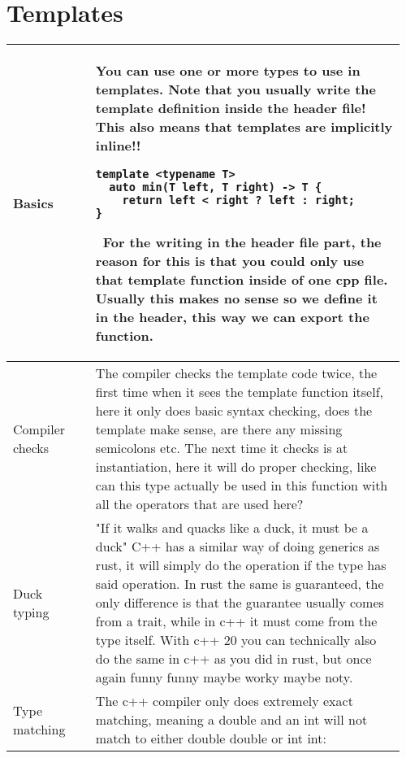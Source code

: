 \documentclass[main.tex,fontsize=8pt,paper=a4,paper=portrait,DIV=calc]{scrartcl}
\begin{document}
\begin{table}[ht!]
\section{Templates}
\begin{tabular}{|m{0.2\linewidth}|m{0.755\linewidth}|}
\hline
Basics & 
You can use one or more types to use in templates.\newline
\textcolor{OliveGreen}{Note that you usually write the template definition inside the header file!\newline
\textbf{This also means that templates are implicitly inline!!}}\newline
\begin{lstlisting}
template <typename T>
  auto min(T left, T right) -> T {
    return left < right ? left : right;
}
\end{lstlisting}
\, \newline
For the writing in the header file part, the reason for this is that you could only use that template function inside of one cpp file. Usually this makes no sense so we define it in the header, this way we can export the function.\\
\hline
Compiler checks & 
The compiler checks the template code twice, the first time when it sees the template function itself, here it only does basic syntax checking, does the template make sense, are there any missing semicolons etc.\newline
The next time it checks is at instantiation, here it will do proper checking, like can this type actually be used in this function with all the operators that are used here?\\
\hline
Duck typing & 
"If it walks and quacks like a duck, it must be a duck"\newline
C++ has a similar way of doing generics as rust, it will simply do the operation if the type has said operation.\newline
In rust the same is guaranteed, the only difference is that the guarantee usually comes from a trait, while in c++ it must come from the type itself.\newline
With c++ 20 you can technically also do the same in c++ as you did in rust, but once again funny funny maybe worky maybe noty.\\
\hline
Type matching & 
The c++ compiler only does extremely exact matching, meaning a double and an int will not match to either double double or int int:\newline

\end{tabular}
\end{table}
\end{document}
